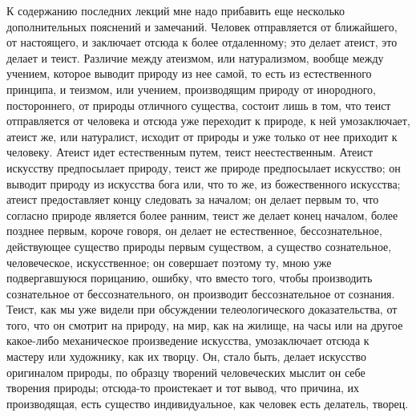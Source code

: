 \documentclass[12pt]{article}
\begin{document}
К содержанию последних лекций мне надо прибавить еще несколько дополнительных пояснений и замечаний. Человек отправляется от ближайшего, от настоящего, и заключает отсюда к более отдаленному; это делает атеист, это делает и теист. Различие между атеизмом, или натурализмом, вообще между учением, которое выводит природу из нее самой, то есть из естественного принципа, и теизмом, или учением, производящим природу от инородного, постороннего, от природы отличного существа, состоит лишь в том, что теист отправляется от человека и отсюда уже переходит к природе, к ней умозаключает, атеист же, или натуралист, исходит от природы и уже только от нее приходит к человеку. Атеист идет естественным путем, теист неестественным. Атеист искусству предпосылает природу, теист же природе предпосылает искусство; он выводит природу из искусства бога или, что то же, из божественного искусства; атеист предоставляет концу следовать за началом; он делает первым то, что согласно природе является более ранним, теист же делает конец началом, более позднее первым, короче говоря, он делает не естественное, бессознательное, действующее существо природы первым существом, а существо сознательное, человеческое, искусственное; он совершает поэтому ту, мною уже подвергавшуюся порицанию, ошибку, что вместо того, чтобы производить сознательное от бессознательного, он производит бессознательное от сознания. Теист, как мы уже видели при обсуждении телеологического доказательства, от того, что он смотрит на природу, на мир, как на жилище, на часы или на другое какое-либо механическое произведение искусства, умозаключает отсюда к мастеру или художнику, как их творцу. Он, стало быть, делает искусство оригиналом природы, по образцу творений человеческих мыслит он себе творения природы; отсюда-то проистекает и тот вывод, что причина, их производящая, есть существо индивидуальное, как человек есть делатель, творец. 
\end{document}
